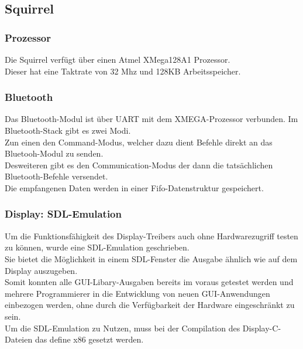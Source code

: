 \documentclass[12pt,a4paper]{article}
\begin{document}
	\subsection{Squirrel}
	\subsubsection{Prozessor}
	Die Squirrel verfügt über einen Atmel XMega128A1 Prozessor.\\
	Dieser hat eine Taktrate von 32 Mhz und 128KB Arbeitsspeicher.\\
	
	
	\subsubsection{Bluetooth}
	\label{bluetooth}
Das Bluetooth-Modul ist über UART mit dem XMEGA-Prozessor verbunden. Im Bluetooth-Stack gibt es zwei Modi. \\
Zun einen den Command-Modus, welcher dazu dient Befehle direkt an das Bluetooh-Modul zu senden.\\
Desweiteren gibt es den Communication-Modus der dann die tatsächlichen Bluetooth-Befehle versendet.\\
Die empfangenen Daten werden in einer Fifo-Datenstruktur gespeichert.\\


\subsubsection{Display: SDL-Emulation}
Um die Funktionsfähigkeit des Display-Treibers auch ohne Hardwarezugriff testen zu können, wurde eine SDL-Emulation geschrieben.\\
Sie bietet die Möglichkeit in einem SDL-Fenster die Ausgabe ähnlich wie auf dem Display auszugeben.\\
Somit konnten alle GUI-Libary-Ausgaben bereits im voraus getestet werden und mehrere Programmierer in die Entwicklung von neuen GUI-Anwendungen einbezogen werden, ohne durch die Verfügbarkeit der Hardware eingeschränkt zu sein.\\
Um die SDL-Emulation zu Nutzen, muss bei der Compilation des Display-C-Dateien das define x86 gesetzt werden.\\
\end{document}
